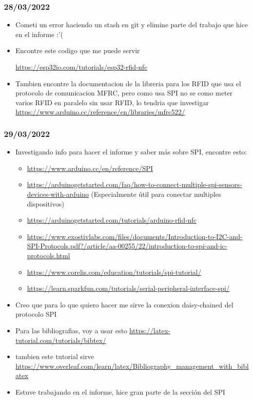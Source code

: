 \documentclass[../informe_krapp.tex]{subfiles}
\begin{document}
\subsubsection{28/03/2022}
\begin{itemize}
	\item Cometi un error haciendo un stash en git y elimine parte del trabajo que hice
	      en el informe :'(
	\item Encontre este codigo que me puede servir

	      \url{https://esp32io.com/tutorials/esp32-rfid-nfc}
	\item Tambien encontre la documentacion de la libreria para los RFID que usa el
	      protocolo de comunicacion MFRC, pero como usa SPI no se como meter varios RFID en
	      paralelo sin usar RFID, lo tendria que investigar
	      \url{https://www.arduino.cc/reference/en/libraries/mfrc522/}
\end{itemize}

\subsubsection{29/03/2022}
\begin{itemize}
	\item Investigando info para hacer el informe y saber más sobre SPI, encontre esto:
	      \begin{itemize}
		      \item \url{https://www.arduino.cc/en/reference/SPI}
		      \item \url{https://arduinogetstarted.com/faq/how-to-connect-multiple-spi-sensors-devices-with-arduino} (Especialmente útil para conectar multiples dispositivos)
		      \item \url{https://arduinogetstarted.com/tutorials/arduino-rfid-nfc}
		      \item \url{https://www.exostivlabs.com/files/documents/Introduction-to-I2C-and-SPI-Protocols.pdf?/article/aa-00255/22/introduction-to-spi-and-ic-protocols.html}
		      \item \url{https://www.corelis.com/education/tutorials/spi-tutorial/}
		      \item \url{https://learn.sparkfun.com/tutorials/serial-peripheral-interface-spi/}
	      \end{itemize}
	\item Creo que para lo que quiero hacer me sirve la conexion daisy-chained
	      del protocolo SPI
	\item Para las bibliografias, voy a usar esto \url{https://latex-tutorial.com/tutorials/bibtex/}
	\item tambien este tutorial sirve \url{https://www.overleaf.com/learn/latex/Bibliography_management_with_biblatex}
	\item Estuve trabajando en el informe, hice gran parte de la sección del SPI

\end{itemize}
\end{document}
